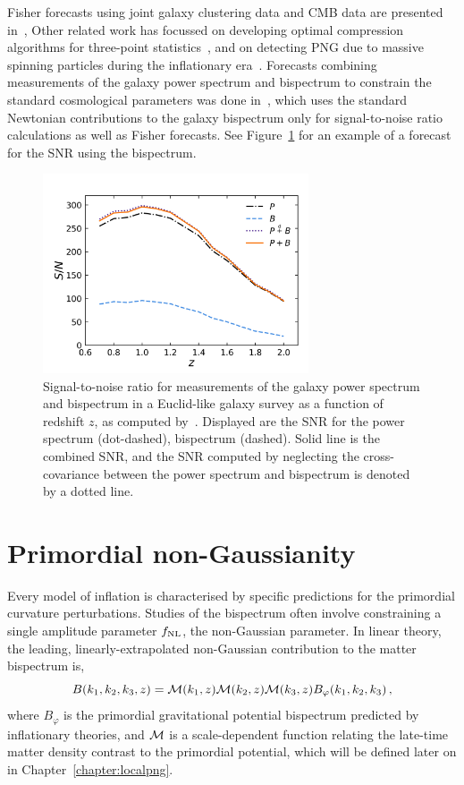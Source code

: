 Fisher forecasts using joint galaxy clustering data and CMB data are presented in~\cite{Sefusatti:2006pa}, Other related work has focussed on developing optimal compression algorithms for three-point statistics~\cite{Byun:2017fkz,Gualdi:2018pyw}, and on detecting PNG due to massive spinning particles during the inflationary era~\cite{MoradinezhadDizgah:2018ssw}. Forecasts combining measurements of the galaxy power spectrum and bispectrum to constrain the standard cosmological parameters was done in~\cite{Yankelevich:2018uaz}, which uses the standard Newtonian contributions to the galaxy bispectrum only for signal-to-noise ratio calculations as well as Fisher forecasts. See Figure~\ref{fig:snr_yp} for an example of a forecast for the SNR using the bispectrum.

\begin{figure}[!ht]
	\centering
	\includegraphics[width=0.7\textwidth]{fig/ypsnr.png}
	\caption{Signal-to-noise ratio for measurements of the galaxy power spectrum and bispectrum in a Euclid-like galaxy survey as a function of redshift $z$, as computed by~\cite{Yankelevich:2018uaz}. Displayed are the SNR for the power spectrum (dot-dashed), bispectrum (dashed). Solid line is the combined SNR, and the SNR computed by neglecting the cross-covariance between the power spectrum and bispectrum is denoted by a dotted line.}
	\label{fig:snr_yp}
\end{figure}

\section{Primordial non-Gaussianity}

Every model of inflation is characterised by specific predictions for the primordial curvature perturbations. Studies of the bispectrum often involve constraining a single amplitude parameter $f_\text{NL}$, the non-Gaussian parameter. In linear theory, the leading, linearly-extrapolated non-Gaussian contribution to the matter bispectrum is, 
\begin{equation}
	B(k_1,k_2,k_3,z) =  \mathcal{M}(k_1,z) \mathcal{M}(k_2,z) \mathcal{M}(k_3,z) B_\varphi(k_1,k_2,k_3)\,,
\end{equation}
where $B_\varphi$ is the primordial gravitational potential bispectrum predicted by inflationary theories, and $\mathcal{M}$ is a scale-dependent function relating the late-time matter density contrast to the primordial potential, which will be defined later on in Chapter~\ref{chapter:localpng}.


